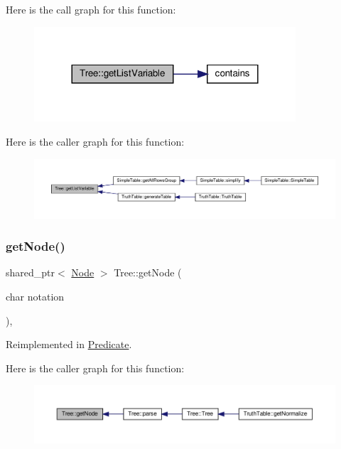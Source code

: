 Here is the call graph for this function\+:\nopagebreak
\begin{figure}[H]
\begin{center}
\leavevmode
\includegraphics[width=276pt]{dd/df8/class_tree_a525967d14a17de0ad9c9072b025af1c3_cgraph}
\end{center}
\end{figure}
Here is the caller graph for this function\+:\nopagebreak
\begin{figure}[H]
\begin{center}
\leavevmode
\includegraphics[width=350pt]{dd/df8/class_tree_a525967d14a17de0ad9c9072b025af1c3_icgraph}
\end{center}
\end{figure}
\mbox{\label{class_tree_a60a9b7d65fc663d2db005b01119efa73}} 
\subsubsection{\texorpdfstring{get\+Node()}{getNode()}}
{\footnotesize\ttfamily shared\+\_\+ptr$<$ \hyperlink{class_node}{Node} $>$ Tree\+::get\+Node (\begin{DoxyParamCaption}\item[{char}]{notation }\end{DoxyParamCaption})\hspace{0.3cm}{\ttfamily [protected]}, {\ttfamily [virtual]}}



Reimplemented in \hyperlink{class_predicate_a68cb341b481a973037db8d4b369bd73f}{Predicate}.

Here is the caller graph for this function\+:\nopagebreak
\begin{figure}[H]
\begin{center}
\leavevmode
\includegraphics[width=350pt]{dd/df8/class_tree_a60a9b7d65fc663d2db005b01119efa73_icgraph}
\end{center}
\end{figure}
\mbox{\label{class_tree_a7d2c78122409858b2516b52514bd7fe8}} 
